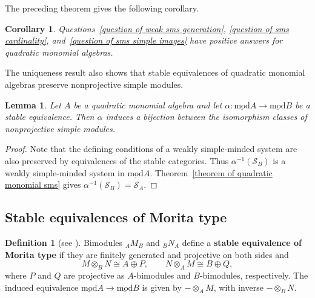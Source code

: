 \documentclass[11pt]{article}
\newcommand{\smod}{\operatorname{\underline{mod}}}
\newtheorem{lemma}[theorem]{Lemma}
\newtheorem{corollary}[theorem]{Corollary}
\theoremstyle{definition}
\newtheorem{definition}[theorem]{Definition}
\begin{document}
		The preceding theorem gives the following corollary.

		\begin{corollary}\label{corollary of sms questions}
			Questions~\ref{question of weak sms generation}, \ref{question of sms cardinality}, and~\ref{question of sms simple images} have positive answers for quadratic monomial algebras.
		\end{corollary}

		The uniqueness result also shows that stable equivalences of quadratic monomial algebras preserve nonprojective simple modules.

		\begin{lemma}\label{lemma of AG simple preservation}
			Let $A$ be a quadratic monomial algebra and let $\alpha:\smod A\to\smod B$ be a stable equivalence. Then $\alpha$ induces a bijection between the isomorphism classes of nonprojective simple modules.
		\end{lemma}

		\begin{proof}
			Note that the defining conditions of a weakly simple-minded system are also preserved by equivalences of the stable categories. Thus $\alpha^{-1}(\mathcal S_B)$ is a weakly simple-minded system in $\smod A$. Theorem~\ref{theorem of quadratic monomial sms} gives $\alpha^{-1}(\mathcal S_B)=\mathcal S_A$.
		\end{proof}

	\subsection{Stable equivalences of Morita type}


		\begin{definition}[{see \cite[Section~5.3]{Zim14}}]
			\label{definition of stable equivalence of Morita type}
			Bimodules ${}_AM_B$ and ${}_BN_A$ define a \textbf{stable equivalence of Morita type} if they are finitely generated and projective on both sides and
			\[
				M\otimes_BN\cong A\oplus P,\qquad
				N\otimes_AM\cong B\oplus Q,
			\]
			where $P$ and $Q$ are projective as $A$-bimodules and $B$-bimodules, respectively.
			The induced equivalence $\smod A\to\smod B$ is given by $-\otimes_AM$, with inverse $-\otimes_BN$.
		\end{definition}


\end{document}
